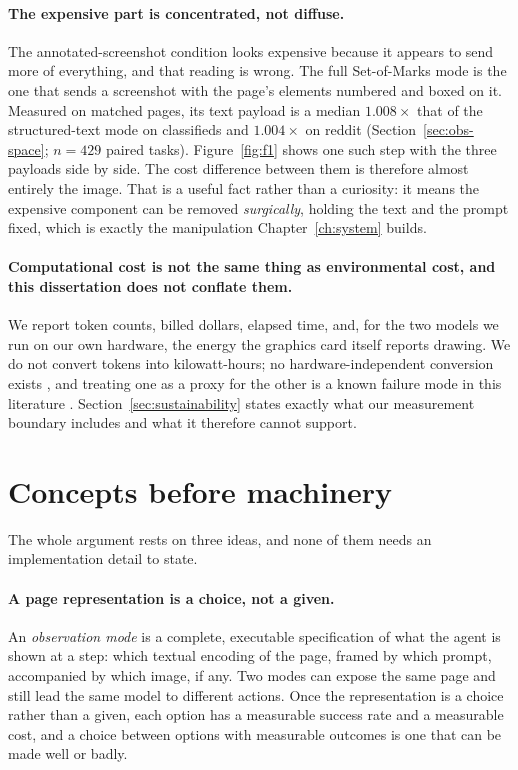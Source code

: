\paragraph{The expensive part is concentrated, not diffuse.} The annotated-screenshot condition looks expensive because it appears to send more of everything, and that reading is wrong. The
full Set-of-Marks mode is the one that sends a screenshot with the page's
elements numbered and boxed on it. Measured on matched pages, its text payload
is a median $1.008\times$ that of the structured-text mode on classifieds and $1.004\times$ on reddit (Section~\ref{sec:obs-space};
$n=429$ paired tasks). Figure~\ref{fig:f1} shows one such step with the three
payloads side by side. The cost difference between them is therefore almost
entirely the image. That is a useful fact rather than a curiosity: it means
the expensive component can be removed \emph{surgically}, holding the text and
the prompt fixed, which is exactly the manipulation Chapter~\ref{ch:system}
builds.

\paragraph{Computational cost is not the same thing as environmental cost, and
this dissertation does not conflate them.} We report token counts, billed dollars, elapsed time, and, for the two
models we run on our own hardware, the energy the graphics card itself
reports drawing. We do not convert tokens into
kilowatt-hours; no hardware-independent conversion exists
\citep{fernandez2025energy}, and treating one as a proxy for the other is a
known failure mode in this literature \citep{lannelongue2021green,
henderson2020systematic}. Section~\ref{sec:sustainability} states exactly what
our measurement boundary includes and what it therefore cannot support.

\FloatBarrier
\section{Concepts before machinery}
\label{sec:concepts}

The whole argument rests on three ideas, and none of them needs an implementation detail to state.

\paragraph{A page representation is a choice, not a given.} An \emph{observation
mode} is a complete, executable specification of what the agent is shown at a
step: which textual encoding of the page, framed by which prompt, accompanied by
which image, if any. Two modes can expose the same page and still lead the same
model to different actions. Once the representation is a choice rather than a given, each option has a
measurable success rate and a measurable cost, and a choice between options
with measurable outcomes is one that can be made well or badly.


